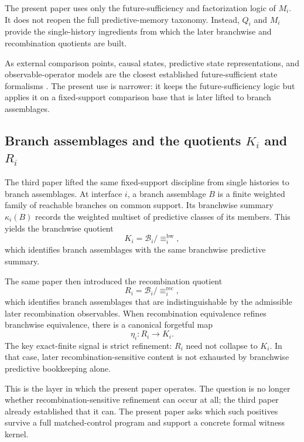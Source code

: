 \documentclass[11pt]{article}
\theoremstyle{definition}
\begin{document}
The present paper uses only the future-sufficiency and factorization logic of \(M_i\). It does not reopen the full predictive-memory taxonomy. Instead, \(Q_i\) and \(M_i\) provide the single-history ingredients from which the later branchwise and recombination quotients are built.

As external comparison points, causal states, predictive state representations, and observable-operator models are the closest established future-sufficient state formalisms \cite{CrutchfieldYoung1989,ShaliziCrutchfield2001,LittmanSuttonSingh2001,Jaeger2000}. The present use is narrower: it keeps the future-sufficiency logic but applies it on a fixed-support comparison base that is later lifted to branch assemblages.

\subsection{Branch assemblages and the quotients \(K_i\) and \(R_i\)}

The third paper lifted the same fixed-support discipline from single histories to branch assemblages. At interface \(i\), a branch assemblage \(B\) is a finite weighted family of reachable branches on common support. Its branchwise summary \(\kappa_i(B)\) records the weighted multiset of predictive classes of its members. This yields the branchwise quotient
\[
K_i = \mathcal B_i / {\equiv_i^{\mathrm{bw}}},
\]
which identifies branch assemblages with the same branchwise predictive summary. \cite{Tsiokos2026MarkingErasureRecombination}

The same paper then introduced the recombination quotient
\[
R_i = \mathcal B_i / {\equiv_i^{\mathrm{rec}}},
\]
which identifies branch assemblages that are indistinguishable by the admissible later recombination observables. When recombination equivalence refines branchwise equivalence, there is a canonical forgetful map
\[
\eta_i : R_i \to K_i.
\]
The key exact-finite signal is strict refinement: \(R_i\) need not collapse to \(K_i\). In that case, later recombination-sensitive content is not exhausted by branchwise predictive bookkeeping alone. \cite{Tsiokos2026MarkingErasureRecombination}

This is the layer in which the present paper operates. The question is no longer whether recombination-sensitive refinement can occur at all; the third paper already established that it can. The present paper asks which such positives survive a full matched-control program and support a concrete formal witness kernel.
\end{document}
